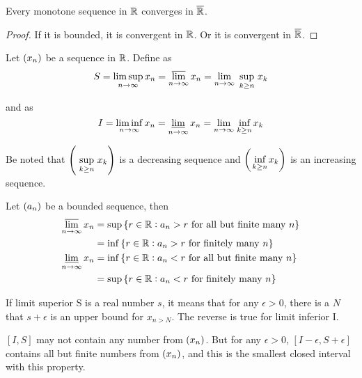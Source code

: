 \begin{theorem}
    Every monotone sequence in $\mathbb{R}$ converges in $\overline{\mathbb{R}}$.
\end{theorem}
\begin{proof}
    If it is bounded, it is convergent in $\mathbb{R}$. Or it is convergent in $\overline{\mathbb{R}}$.
\end{proof}

\begin{definition}
    Let $\sequence{x_n}$ be a sequence in $\mathbb{R}$. Define  as
    \begin{equation}
        S = \limsup_{n \rightarrow \infty} x_n = \varlimsup_{n\rightarrow \infty} x_n = \lim_{n \rightarrow \infty} \underset{k \geq n}{\text{ sup }} x_k
    \end{equation}
    
    and  as
    \begin{equation}
        I = \liminf_{n \rightarrow \infty} x_n = \varliminf_{n\rightarrow \infty} x_n = \lim_{n \rightarrow \infty} \underset{k \geq n}{\text{ inf }} x_k
    \end{equation}    
\end{definition}

Be noted that $\sequence{\underset{k \geq n}{\text{ sup }} x_k}$ is a decreasing sequence and $\sequence{\underset{k \geq n}{\text{ inf }} x_k}$ is an increasing sequence.


\begin{theorem}\label{definition_of_limit_superium_infinium}
    Let $\sequence{a_n}$ be a bounded sequence, then
    \begin{equation}
        \begin{aligned}
            \varlimsup_{n\rightarrow \infty} x_n &= \sup \set{r \in \mathbb{R}: a_n > r \text{ for all but finite many } n} \\
            &= \inf \set{r \in \mathbb{R}: a_n > r \text{ for finitely many } n} \\
            \varliminf_{n\rightarrow \infty} x_n &= \inf \set{r \in \mathbb{R}: a_n < r \text{ for all but finite many } n} \\
            &= \sup \set{r \in \mathbb{R}: a_n < r \text{ for finitely many } n} 
        \end{aligned}
    \end{equation}

    
    If limit superior S is a real number $s$, it means that for any $\epsilon>0$, there is a $N$ that $s + \epsilon$ is an upper bound for $x_{n > N}$. The reverse is true for limit inferior I.

    $[I,S]$ may not contain any number from $\sequence{x_n}$. But for any $\epsilon >0$, $[I - \epsilon, S + \epsilon]$ contains all but finite numbers from $\sequence{x_n}$, and this is the smallest closed interval with this property.
\end{theorem}




